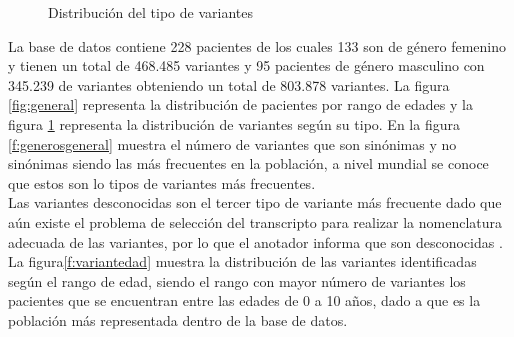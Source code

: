 \begin{figure}[H]
	\centering
	\caption{Distribución del tipo de variantes}
	\label{f:variantesgeneral}
\end{figure}

La base de datos contiene 228 pacientes de los cuales 133 son de género femenino y tienen un total de 468.485 variantes y 95 pacientes de género masculino con 345.239 de variantes obteniendo  un total de 803.878 variantes. La  figura \ref{fig:general} representa la distribución de pacientes por rango de edades y la figura \ref{f:variantesgeneral} representa la distribución de variantes según su tipo. En la figura \ref{f:generosgeneral} muestra el número de variantes que son sinónimas y no sinónimas siendo las más frecuentes en la población, a  nivel mundial se conoce que estos son lo tipos de variantes más frecuentes\cite{Fu2013}.\\

Las variantes desconocidas son el tercer tipo de variante más frecuente dado que aún existe el problema de selección del transcripto para realizar la nomenclatura adecuada de las variantes, por lo que el anotador informa que son desconocidas \cite{McCarthy2014}. La figura\ref{f:variantedad} muestra la distribución de las variantes identificadas según el rango de edad, siendo el rango con mayor número de variantes los pacientes que se encuentran entre las edades de 0 a 10 años, dado a que es la población más representada dentro de la base de datos. \\

